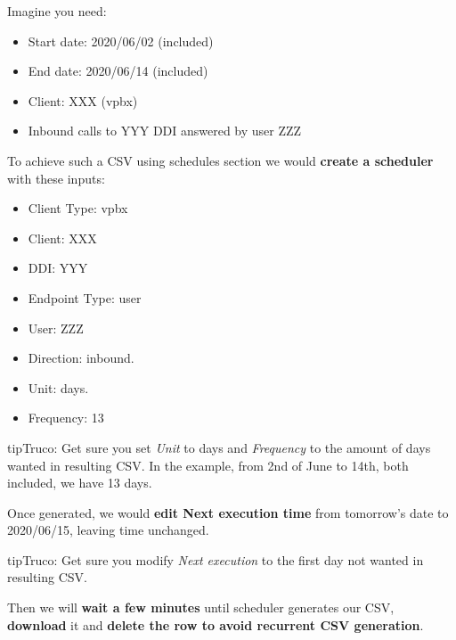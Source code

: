 \documentclass[letterpaper,10pt,spanish]{sphinxmanual}
\begin{document}
Imagine you need:
\begin{itemize}
\item {} 
Start date: 2020/06/02 (included)

\item {} 
End date: 2020/06/14 (included)

\item {} 
Client: XXX (vpbx)

\item {} 
Inbound calls to YYY DDI answered by user ZZZ

\end{itemize}

To achieve such a CSV using schedules section we would \textbf{create a scheduler} with these inputs:
\begin{itemize}
\item {} 
Client Type: vpbx

\item {} 
Client: XXX

\item {} 
DDI: YYY

\item {} 
Endpoint Type: user

\item {} 
User: ZZZ

\item {} 
Direction: inbound.

\item {} 
Unit: days.

\item {} 
Frequency: 13

\end{itemize}

\begin{notice}{tip}{Truco:}
Get sure you set \emph{Unit} to days and \emph{Frequency} to the amount of days wanted in resulting CSV. In the example,
from 2nd of June to 14th, both included, we have 13 days.
\end{notice}

Once generated, we would \textbf{edit Next execution time} from tomorrow's date to 2020/06/15, leaving time unchanged.

\begin{notice}{tip}{Truco:}
Get sure you modify \emph{Next execution} to the first day not wanted in resulting CSV.
\end{notice}

Then we will \textbf{wait a few minutes} until scheduler generates our CSV, \textbf{download} it and \textbf{delete the row to avoid recurrent
CSV generation}.
\end{document}
